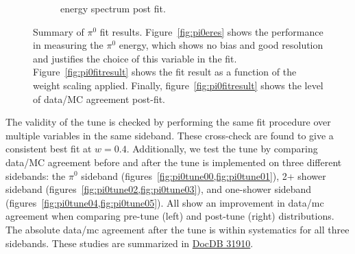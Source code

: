 \begin{figure}[H]
\begin{center}
\begin{subfigure}[b]{0.33\textwidth}
    \caption{\label{fig:pi0fitspectrum}energy spectrum post fit.}
    \end{subfigure}
\caption{Summary of $\pi^0$ fit results. Figure~\ref{fig:pi0eres} shows the performance in measuring the $\pi^0$ energy, which shows no bias and good resolution and justifies the choice of this variable in the fit. Figure~\ref{fig:pi0fitresult} shows the fit result as a function of the weight scaling applied. Finally, figure~\ref{fig:pi0fitresult} shows the level of data/MC agreement post-fit.}
\end{center}
\end{figure}

The validity of the tune is checked by performing the same fit procedure over multiple variables in the same sideband. These cross-check are found to give a consistent best fit at $w = 0.4$. Additionally, we test the tune by comparing data/MC agreement before and after the tune is implemented on three different sidebands: the $\pi^0$ sideband (figures~\cref{fig:pi0tune00,fig:pi0tune01}), 2+ shower sideband (figures~\cref{fig:pi0tune02,fig:pi0tune03}), and one-shower sideband (figures~\cref{fig:pi0tune04,fig:pi0tune05}). All show an improvement in data/mc agreement when comparing pre-tune (left) and post-tune (right) distributions. The absolute data/mc agreement after the tune is within systematics for all three sidebands. These studies are summarized in \href{https://microboone-docdb.fnal.gov/cgi-bin/private/ShowDocument?docid=31910}{DocDB 31910}.



